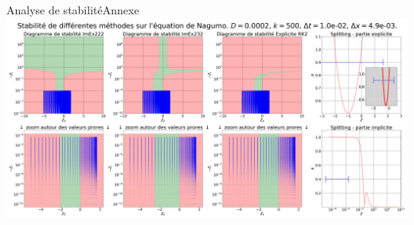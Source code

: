 \begin{frame}{Analyse de stabilité}{Annexe}
    \includegraphics[width = \textwidth]{medias/2_/1_/STABILITE_D0.0002_k500_dt1.0e-02_dx4.9e-03.png}
\end{frame}